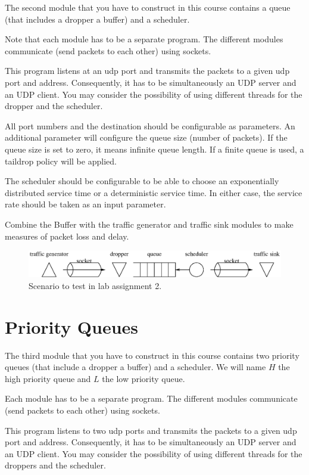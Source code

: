 The second module that you have to construct in this course contains a queue (that includes a dropper a buffer) and a scheduler.

Note that each module has to be a separate program. The different modules communicate (send packets to each other) using sockets.

This program listens at an udp port and transmits the packets to a given udp port and address. Consequently, it has to be simultaneously an UDP server and an UDP client. You may consider the possibility of using different threads for the dropper and the scheduler.

All port numbers and the destination should be configurable as parameters. An additional parameter will configure the queue size (number of packets). If the queue size is set to zero, it means infinite queue length. If a finite queue is used, a taildrop policy will be applied.

The scheduler should be configurable to be able to choose an exponentially distributed service time or a deterministic service time. In either case, the service rate should be taken as an input parameter.

Combine the Buffer with the traffic generator and traffic sink modules to make measures of packet loss and delay.

\begin{figure}[!h]
\centering
\includegraphics[width=\linewidth]{figures/scenario.eps}
\caption{Scenario to test in lab assignment 2.}
\label{fig:scenario}
\end{figure}

\section{Priority Queues}
The third module that you have to construct in this course contains two priority queues (that include a dropper a buffer) and a scheduler.
We will name $H$ the high priority queue and $L$ the low priority queue.

Each module has to be a separate program. The different modules communicate (send packets to each other) using sockets.

This program listens to two udp ports and transmits the packets to a given udp port and address. Consequently, it has to be simultaneously an UDP server and an UDP client. You may consider the possibility of using different threads for the droppers and the scheduler.


